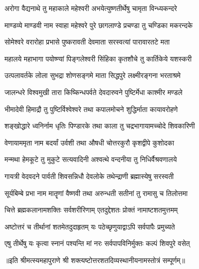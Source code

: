 \twolineshloka
{अरोगा वैद्यनाथे तु महाकाले महेश्वरी}
{अभयेत्युष्णतीर्थेषु चामृता विन्ध्यकन्दरे}

\twolineshloka
{माण्डव्ये माण्डवी नाम स्वाहा महेश्वरे पुरे}
{छागलाण्डे प्रचण्डा तु चण्डिका मकरन्दके}

\twolineshloka
{सोमेश्वरे वरारोहा प्रभासे पुष्करावती}
{देवमाता सरस्वत्यां पारावारतटे मता}

\twolineshloka
{महालये महाभागा पयोष्ण्यां पिङ्गलेश्वरी}
{सिंहिका कृतशौचे तु कार्तिकेये यशस्करी}

\twolineshloka
{उत्पलावर्तके लोला सुभद्रा शोणसङ्गमे}
{माता सिद्धपुरे लक्ष्मीरङ्गना भरताश्रमे}

\twolineshloka
{जालन्धरे विश्वमुखी तारा किष्किन्धपर्वते}
{देवदारुवने पुष्टिर्मेधा काश्मीर मण्डले}

\twolineshloka
{भीमादेवी हिमाद्रौ तु पुष्टिर्विश्वेश्वरे तथा}
{कपालमोचने शुद्धिर्माता कायावरोहणे}

\twolineshloka
{शङ्खोद्धारे ध्वनिर्नाम धृतिः पिण्डारके तथा}
{काला तु चद्रभागायामच्चोदे शिवकारिणी}

\twolineshloka
{वेणायाममृता नाम बदर्यां उर्वशी तथा}
{औषधी चोत्तरकुरौ कृशद्वीपे कुशोदका}

\twolineshloka
{मन्मथा हेमकूटे तु मुकुटे सत्यवादिनी}
{अश्वत्थे वन्दनीया तु निधिर्वैश्रवणालये}

\twolineshloka
{गायत्री वेदवदने पार्वती शिवसन्निधौ}
{देवलोके तथेन्द्राणी ब्रह्मास्येषु सरस्वती}

\twolineshloka
{सूर्यबिम्बे प्रभा नाम मातॄणां वैष्णवी तथा}
{अरुन्धती सतीनां तु रामासु च तिलोत्तमा}

\twolineshloka
{चित्ते ब्रह्मकलानामशक्तिः सर्वशरीरिणाम्}
{एतदुद्देशतः प्रोक्तं नामाष्टशतमुत्तमम्}

\twolineshloka
{अष्टोत्तरं च तीर्थानां शतमेतदुदाहृतम्}
{यः पठेच्छृणुयाद्वाऽपि सर्वपापैः प्रमुच्यते}

\twolineshloka
{एषु तीर्थेषु यः कृत्वा स्नानं पश्यन्ति मां नरः}
{सर्वपापविनिर्मुक्तः कल्पं शिवपुरे वसेत्}

॥इति श्रीमत्स्यमहापुराणे श्री शक्त्यष्टोत्तरशतदिव्यस्थानीयनामस्तोत्रं सम्पूर्णम्॥